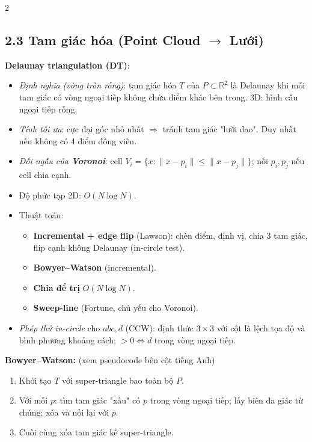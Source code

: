 \begin{paracol}{2}
\switchcolumn

\subsection*{2.3 Tam giác hóa (Point Cloud $\to$ Lưới)}

\textbf{Delaunay triangulation (DT)}:
\begin{itemize}[leftmargin=*,nosep]
  \item \emph{Định nghĩa (vòng tròn rỗng)}: tam giác hóa $T$ của $P\subset\mathbb{R}^2$ là Delaunay khi mỗi tam giác có vòng ngoại tiếp không chứa điểm khác bên trong. 3D: hình cầu ngoại tiếp rỗng.
  \item \emph{Tính tối ưu}: cực đại góc nhỏ nhất $\Rightarrow$ tránh tam giác "lưỡi dao". Duy nhất nếu không có 4 điểm đồng viên.
  \item \emph{Đối ngẫu của \textbf{Voronoi}}: cell $V_i=\{x:\|x-p_i\|\le\|x-p_j\|\}$; nối $p_i,p_j$ nếu cell chia cạnh.
  \item Độ phức tạp 2D: $O(N\log N)$.
  \item Thuật toán:
    \begin{itemize}[leftmargin=1em,nosep]
      \item \textbf{Incremental + edge flip} (Lawson): chèn điểm, định vị, chia 3 tam giác, flip cạnh không Delaunay (in-circle test).
      \item \textbf{Bowyer–Watson} (incremental).
      \item \textbf{Chia để trị} $O(N\log N)$.
      \item \textbf{Sweep-line} (Fortune, chủ yếu cho Voronoi).
    \end{itemize}
  \item \emph{Phép thử in-circle} cho $abc,d$ (CCW): định thức $3\times3$ với cột là lệch tọa độ và bình phương khoảng cách; $>0\Leftrightarrow d$ trong vòng ngoại tiếp.
\end{itemize}

\textbf{Bowyer–Watson:} (xem pseudocode bên cột tiếng Anh)
\begin{enumerate}[leftmargin=*,nosep]
  \item Khởi tạo $T$ với super-triangle bao toàn bộ $P$.
  \item Với mỗi $p$: tìm tam giác "xấu" có $p$ trong vòng ngoại tiếp; lấy biên đa giác từ chúng; xóa và nối lại với $p$.
  \item Cuối cùng xóa tam giác kề super-triangle.
\end{enumerate}


\end{paracol}
